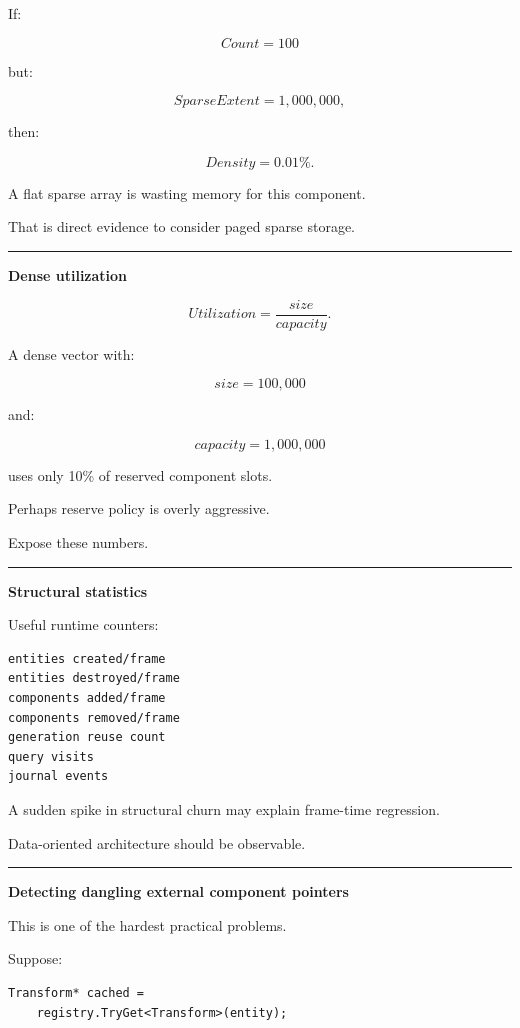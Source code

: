 If:

\[
Count=100
\]

but:

\[
SparseExtent=1,000,000,
\]

then:

\[
Density=0.01\%.
\]

A flat sparse array is wasting memory for this component.

That is direct evidence to consider paged sparse storage.

\begin{center}\rule{0.5\linewidth}{0.5pt}\end{center}

\textbf{Dense utilization}

\[
Utilization=
\frac{size}
{capacity}.
\]

A dense vector with:

\[
size=100,000
\]

and:

\[
capacity=1,000,000
\]

uses only 10\% of reserved component slots.

Perhaps reserve policy is overly aggressive.

Expose these numbers.

\begin{center}\rule{0.5\linewidth}{0.5pt}\end{center}

\textbf{Structural statistics}

Useful runtime counters:

\begin{verbatim}
entities created/frame
entities destroyed/frame
components added/frame
components removed/frame
generation reuse count
query visits
journal events
\end{verbatim}

A sudden spike in structural churn may explain frame-time regression.

Data-oriented architecture should be observable.

\begin{center}\rule{0.5\linewidth}{0.5pt}\end{center}

\textbf{Detecting dangling external component pointers}

This is one of the hardest practical problems.

Suppose:

\begin{verbatim}
Transform* cached =
    registry.TryGet<Transform>(entity);
\end{verbatim}

